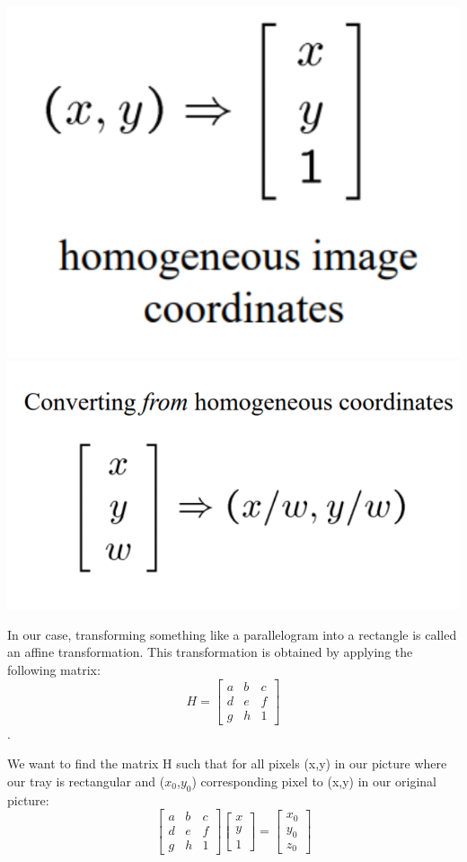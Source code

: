 \documentclass{article}
\begin{document}
\begin{center}
    \includegraphics[scale=0.5]{images/homoge.png}  
    \includegraphics[scale=0.5]{images/homoge_2.png}      
\end{center}

In our case, transforming something like a parallelogram into a rectangle is called an affine transformation.  This transformation is obtained by applying the following matrix:
 $$H = \begin{bmatrix} a & b & c \\ d & e & f \\ g & h & 1 \end{bmatrix} $$.
 
 We want to find the matrix H such that for all pixels (x,y) in our picture where our tray is rectangular and ($x_0$,$y_0$) corresponding pixel to (x,y) in our original picture:
 $$\begin{bmatrix} a & b & c \\ d & e & f \\ g & h & 1 \end{bmatrix} \begin{bmatrix} x \\ y \\ 1 \end{bmatrix}  = \begin{bmatrix} x_0 \\ y_0 \\ z_0 \end{bmatrix}$$
 
\end{document}
